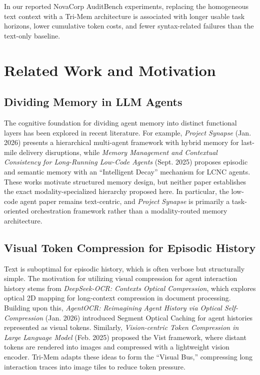 \documentclass[conference]{IEEEtran}
\begin{document}
In our reported NovaCorp AuditBench experiments, replacing the homogeneous text context with a Tri-Mem architecture is associated with longer usable task horizons, lower cumulative token costs, and fewer syntax-related failures than the text-only baseline.

\section{Related Work and Motivation}

\subsection{Dividing Memory in LLM Agents}
The cognitive foundation for dividing agent memory into distinct functional layers has been explored in recent literature. For example, \textit{Project Synapse} (Jan. 2026) presents a hierarchical multi-agent framework with hybrid memory for last-mile delivery disruptions, while \textit{Memory Management and Contextual Consistency for Long-Running Low-Code Agents} (Sept. 2025) proposes episodic and semantic memory with an ``Intelligent Decay'' mechanism for LCNC agents. These works motivate structured memory design, but neither paper establishes the exact modality-specialized hierarchy proposed here. In particular, the low-code agent paper remains text-centric, and \textit{Project Synapse} is primarily a task-oriented orchestration framework rather than a modality-routed memory architecture.

\subsection{Visual Token Compression for Episodic History}
Text is suboptimal for episodic history, which is often verbose but structurally simple. The motivation for utilizing visual compression for agent interaction history stems from \textit{DeepSeek-OCR: Contexts Optical Compression}, which explores optical 2D mapping for long-context compression in document processing. Building upon this, \textit{AgentOCR: Reimagining Agent History via Optical Self-Compression} (Jan. 2026) introduced Segment Optical Caching for agent histories represented as visual tokens. Similarly, \textit{Vision-centric Token Compression in Large Language Model} (Feb. 2025) proposed the Vist framework, where distant tokens are rendered into images and compressed with a lightweight vision encoder. Tri-Mem adapts these ideas to form the ``Visual Bus,'' compressing long interaction traces into image tiles to reduce token pressure.
\end{document}
